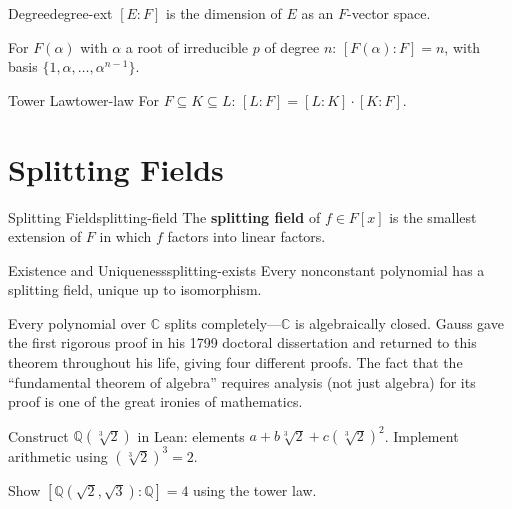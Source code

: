 \documentclass[11pt, a4paper, oneside]{book}
\newcommand{\Q}{\mathbb{Q}}
\newcommand{\C}{\mathbb{C}}
\newcounter{exercise}[chapter]
\begin{document}
\begin{defn}{Degree}{degree-ext}
$[E:F]$ is the dimension of $E$ as an $F$-vector space.
\end{defn}

For $F(\alpha)$ with $\alpha$ a root of irreducible $p$ of degree $n$:
$[F(\alpha):F] = n$, with basis $\{1, \alpha, \ldots, \alpha^{n-1}\}$.

\begin{thm}{Tower Law}{tower-law}
For $F \subseteq K \subseteq L$: $[L:F] = [L:K] \cdot [K:F]$.
\end{thm}

\section{Splitting Fields}

\begin{defn}{Splitting Field}{splitting-field}
The \textbf{splitting field} of $f \in F[x]$ is the smallest extension of
$F$ in which $f$ factors into linear factors.
\end{defn}

\begin{thm}{Existence and Uniqueness}{splitting-exists}
Every nonconstant polynomial has a splitting field, unique up to isomorphism.
\end{thm}

\begin{historical}[title={The Fundamental Theorem of Algebra}]
Every polynomial over $\C$ splits completely---$\C$ is algebraically closed.
Gauss gave the first rigorous proof in his 1799 doctoral dissertation and
returned to this theorem throughout his life, giving four different proofs.
The fact that the ``fundamental theorem of algebra'' requires analysis (not
just algebra) for its proof is one of the great ironies of mathematics.
\end{historical}

\begin{exercisebox}[title={Exercise 6.1}]
Construct $\Q(\sqrt[3]{2})$ in Lean: elements $a + b\sqrt[3]{2} + c(\sqrt[3]{2})^2$. Implement arithmetic using $(\sqrt[3]{2})^3 = 2$.
\end{exercisebox}

\begin{exercisebox}[title={Exercise 6.2}]
Show $[\Q(\sqrt{2}, \sqrt{3}):\Q] = 4$ using the tower law.
\end{exercisebox}
\end{document}
